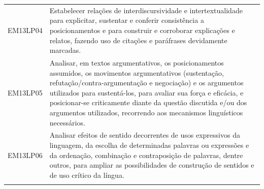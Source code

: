\documentclass[12pt]{extarticle}
\begin{document}
\begin{longtable}{ll}
EM13LP04   & Estabelecer relações de interdiscursividade e intertextualidade para explicitar, sustentar e conferir consistência a posicionamentos e para construir e corroborar explicações e relatos, fazendo uso de citações e paráfrases devidamente marcadas.                                                                                                                                                                                                                                                                                                                                                                                                                                                                                                                                                                  \\
\rowcolor[HTML]{E0F7FA} 
EM13LP05   & Analisar, em textos argumentativos, os posicionamentos assumidos, os movimentos argumentativos (sustentação, refutação/contra-argumentação e negociação) e os argumentos utilizados para sustentá-los, para avaliar sua força e eficácia, e posicionar-se criticamente diante da questão discutida e/ou dos argumentos utilizados, recorrendo aos mecanismos linguísticos necessários.                                                                                                                                                                                                                                                                                                                                                                                                                                \\
\rowcolor[HTML]{FFF} 
EM13LP06   & Analisar efeitos de sentido decorrentes de usos expressivos da linguagem, da escolha de determinadas palavras ou expressões e da ordenação, combinação e contraposição de palavras, dentre outros, para ampliar as possibilidades de construção de sentidos e de uso crítico da língua.                                                                                                                                                                                                                                                                                                                                                                                                                                                                                                                               \\
\rowcolor[HTML]{E0F7FA} 

\end{longtable}
\end{document}
